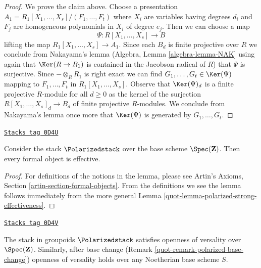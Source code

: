 \begin{proof}
\medskip\noindent
We prove the claim above.
Choose a presentation $A_1 = R_1[X_1, \ldots, X_s]/(F_1, \ldots, F_t)$
where $X_i$ are variables having degrees $d_i$ and $F_j$
are homogeneous polynomials in $X_i$ of degree $e_j$.
Then we can choose a map
$$
\Psi : R[X_1, \ldots, X_s] \longrightarrow B
$$
lifting the map $R_1[X_1, \ldots, X_s] \to A_1$. Since each $B_d$
is finite projective over $R$ we conclude from
Nakayama's lemma (Algebra, Lemma \ref{algebra-lemma-NAK}
using again that $\Ker(R \to R_1)$ is contained in the Jacobson radical
of $R$) that $\Psi$ is surjective. Since $- \otimes_R R_1$ is right
exact we can find $G_1, \ldots, G_t \in \Ker(\Psi)$
mapping to $F_1, \ldots, F_t$ in $R_1[X_1, \ldots, X_s]$.
Observe that $\Ker(\Psi)_d$ is a finite projective $R$-module
for all $d \geq 0$ as the kernel of the surjection
$R[X_1, \ldots, X_s]_d \to B_d$ of finite projective $R$-modules.
We conclude from Nakayama's lemma once more that
$\Ker(\Psi)$ is generated by $G_1, \ldots, G_t$.
\end{proof}

\begin{lemma}
\label{quot-lemma-polarized-existence}
\href{https://stacks.math.columbia.edu/tag/0D4U}{\texttt{Stacks tag 0D4U}}

Consider the stack $\Polarizedstack$ over the base
scheme $\Spec(\mathbf{Z})$. Then every formal object is effective.
\end{lemma}

\begin{proof}

For definitions of the notions in the lemma, please see
Artin's Axioms, Section \ref{artin-section-formal-objects}.
From the definitions we see the lemma follows immediately
from the more general Lemma \ref{quot-lemma-polarized-strong-effectiveness}.
\end{proof}

\begin{lemma}
\label{quot-lemma-polarized-defo-thy}
\href{https://stacks.math.columbia.edu/tag/0D4V}{\texttt{Stacks tag 0D4V}}

The stack in groupoids $\Polarizedstack$
satisfies openness of versality over $\Spec(\mathbf{Z})$.
Similarly, after base change (Remark \ref{quot-remark-polarized-base-change})
openness of versality holds over any Noetherian base scheme $S$.
\end{lemma}

